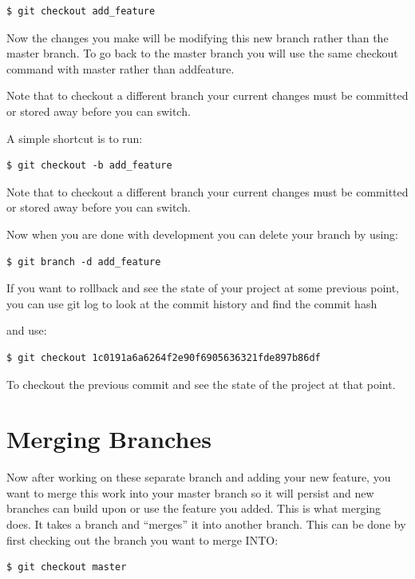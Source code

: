 \documentclass[12pt]{report}
\renewcommand\section[1]{{\chapter{#1}}}
\begin{document}
\begin{verbatim}
$ git checkout add_feature
\end{verbatim}  

Now the changes you make will be modifying this new branch rather than the master branch.  To go back to the master branch you will use the same checkout command with master rather than addfeature.

Note that to checkout a different branch your current changes must be committed or stored away before you can switch.

A simple shortcut is to run:

\begin{verbatim}
$ git checkout -b add_feature
\end{verbatim}  

Note that to checkout a different branch your current changes must be committed or stored away before you can switch.

Now when you are done with development you can delete your branch by using:

\begin{verbatim}
$ git branch -d add_feature
\end{verbatim}  

If you want to rollback and see the state of your project at some previous point, you can use git log to look at the commit history and find the commit hash 

 

and use:

\begin{verbatim}
$ git checkout 1c0191a6a6264f2e90f6905636321fde897b86df
\end{verbatim}  

To checkout the previous commit and see the state of the project at that point.

\section{Merging Branches}

Now after working on these separate branch and adding your new feature, you want to merge this work into your master branch so it will persist and new branches can build upon or use the feature you added.  This is what merging does.  It takes a branch and “merges” it into another branch.  This can be done by first checking out the branch you want to merge INTO:

\begin{verbatim}
$ git checkout master
\end{verbatim}  
\end{document}
